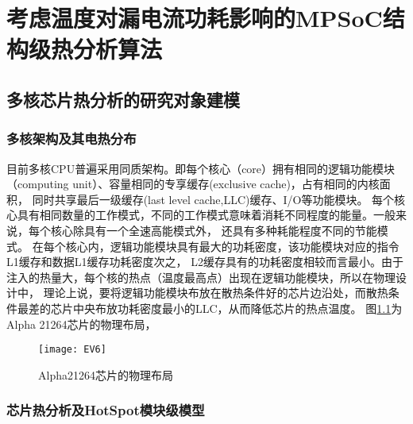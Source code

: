 

\chapter{考虑温度对漏电流功耗影响的MPSoC结构级热分析算法}
\label{cha:SSTA}


\section{多核芯片热分析的研究对象建模}
\label{sec:SSTAbasic}

\subsection{多核架构及其电热分布}

目前多核CPU普遍采用同质架构。即每个核心（core）拥有相同的逻辑功能模块（computing unit）、容量相同的专享缓存(exclusive cache)，占有相同的内核面积， 同时共享最后一级缓存(last level cache,LLC)缓存、I/O等功能模块。 每个核心具有相同数量的工作模式，不同的工作模式意味着消耗不同程度的能量。一般来说，每个核心除具有一个全速高能模式外， 还具有多种耗能程度不同的节能模式。
在每个核心内，逻辑功能模块具有最大的功耗密度，该功能模块对应的指令L1缓存和数据L1缓存功耗密度次之， L2缓存具有的功耗密度相较而言最小。由于注入的热量大，每个核的热点（温度最高点）出现在逻辑功能模块，所以在物理设计中， 理论上说，要将逻辑功能模块布放在散热条件好的芯片边沿处，而散热条件最差的芯片中央布放功耗密度最小的LLC，从而降低芯片的热点温度。 图\ref{fig:ev6}为Alpha 21264芯片的物理布局，

\begin{figure}[H]
  \centering
  \texttt{[image: EV6]}
  \caption{Alpha21264芯片的物理布局}
  \label{fig:ev6}
\end{figure}


\subsection{芯片热分析及HotSpot模块级模型}

